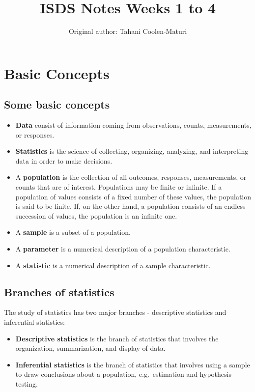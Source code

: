 \documentclass[
]{article}
\title{ISDS Notes Weeks 1 to 4}
\author{Original author: Tahani Coolen-Maturi}
\date{}
\begin{document}
\maketitle

{
\setcounter{tocdepth}{2}
\tableofcontents
}
\newpage

\hypertarget{basic-concepts}{%
\section{Basic Concepts}\label{basic-concepts}}

\hypertarget{some-basic-concepts}{%
\subsection{Some basic concepts}\label{some-basic-concepts}}

\begin{itemize}
\item
  \textbf{Data} consist of information coming from observations, counts,
  measurements, or responses.
\item
  \textbf{Statistics} is the science of collecting, organizing,
  analyzing, and interpreting data in order to make decisions.
\item
  A \textbf{population} is the collection of all outcomes, responses,
  measurements, or counts that are of interest. Populations may be
  finite or infinite. If a population of values consists of a fixed
  number of these values, the population is said to be finite. If, on
  the other hand, a population consists of an endless succession of
  values, the population is an infinite one.
\item
  A \textbf{sample} is a subset of a population.
\item
  A \textbf{parameter} is a numerical description of a population
  characteristic.
\item
  A \textbf{statistic} is a numerical description of a sample
  characteristic.
\end{itemize}

\hypertarget{branches-of-statistics}{%
\subsection{Branches of statistics}\label{branches-of-statistics}}

The study of statistics has two major branches - descriptive statistics
and inferential statistics:

\begin{itemize}
\item
  \textbf{Descriptive statistics} is the branch of statistics that
  involves the organization, summarization, and display of data.
\item
  \textbf{Inferential statistics} is the branch of statistics that
  involves using a sample to draw conclusions about a population,
  e.g.~estimation and hypothesis testing.
\end{itemize}
\end{document}
